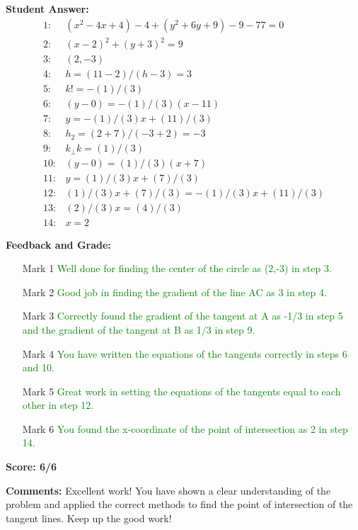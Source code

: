 \documentclass{article}
\begin{document}
\textbf{Student Answer:}
\begin{align*}
1: & (x^{2}-4x+4)-4+(y^{2}+6y+9)-9-77=0 \\
2: & (x-2)^{2}+(y+3)^{2}=9 \\
3: & (2,-3) \\
4: & h=(11-2)/(h-3)=3 \\
5: & k!=-(1)/(3) \\
6: & (y-0)=-(1)/(3)(x-11) \\
7: & y=-(1)/(3)x+(11)/(3) \\
8: & h_2=(2+7)/(-3+2)=-3 \\
9: & k_\perp k=(1)/(3) \\
10: & (y-0)=(1)/(3)(x+7) \\
11: & y=(1)/(3)x+(7)/(3) \\
12: & (1)/(3)x+(7)/(3)=-(1)/(3)x+(11)/(3) \\
13: & (2)/(3)x=(4)/(3) \\
14: & x=2
\end{align*}

\textbf{Feedback and Grade:}
\begin{itemize}
\item[Mark 1] \textcolor{green}{Well done for finding the center of the circle as (2,-3) in step 3.}
\item[Mark 2] \textcolor{green}{Good job in finding the gradient of the line AC as 3 in step 4.}
\item[Mark 3] \textcolor{green}{Correctly found the gradient of the tangent at A as -1/3 in step 5 and the gradient of the tangent at B as 1/3 in step 9.}
\item[Mark 4] \textcolor{green}{You have written the equations of the tangents correctly in steps 6 and 10.}
\item[Mark 5] \textcolor{green}{Great work in setting the equations of the tangents equal to each other in step 12.}
\item[Mark 6] \textcolor{green}{You found the x-coordinate of the point of intersection as 2 in step 14.}
\end{itemize}

\textbf{Score: 6/6}

\textbf{Comments:} Excellent work! You have shown a clear understanding of the problem and applied the correct methods to find the point of intersection of the tangent lines. Keep up the good work!
\end{document}
